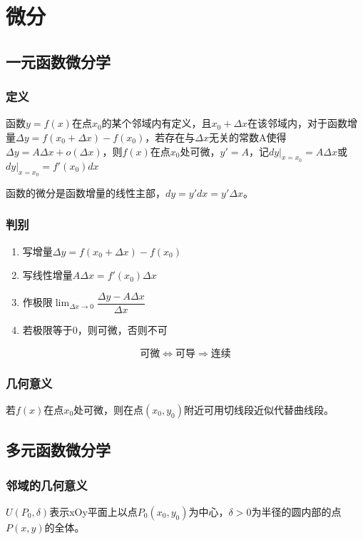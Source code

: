 
\chapter{微分}

\section{一元函数微分学}

\subsection{定义}

函数\(y = f(x)\)在点\(x_0\)的某个邻域内有定义，且\(x_0 + \Delta x\)在该邻域内，对于函数增量\(\Delta y = f(x_0 + \Delta x) - f(x_0)\)，若存在与\(\Delta x\)无关的常数A使得\(\Delta y = A\Delta x + o(\Delta x)\)，则\(f(x)\)在点\(x_0\)处可微，\(y' = A\)，记\(dy|_{x = x_0} = A\Delta x\)或\(dy|_{x = x_0} = f'(x_0)dx\)

函数的微分是函数增量的线性主部，\(dy = y'dx = y'\Delta x\)。


\subsection{判别}
\begin{enumerate}
    \item 写增量\(\Delta y = f(x_0 + \Delta x) - f(x_0)\)
    \item 写线性增量\(A\Delta x = f'(x_0)\Delta x\)
    \item 作极限\(\displaystyle \lim_{\Delta x \to 0}\dfrac{\Delta y - A\Delta x}{\Delta x}\)
    \item 若极限等于0，则可微，否则不可
\end{enumerate}
\[\text{可微} \Leftrightarrow \text{可导} \Rightarrow \text{连续}\]


\subsection{几何意义}

若\(f(x)\)在点\(x_0\)处可微，则在点\((x_0, y_0)\)附近可用切线段近似代替曲线段。


\section{多元函数微分学}

\subsection{邻域的几何意义}
\(U(P_0, \delta)\)表示xOy平面上以点\(P_0(x_0, y_0)\)为中心，\(\delta > 0\)为半径的圆内部的点\(P(x, y)\)的全体。

